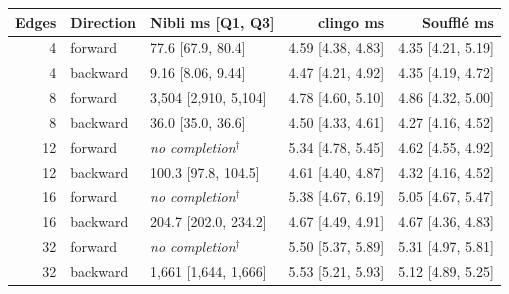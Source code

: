\begin{tabular}{rllrr}
\toprule
Edges & Direction & Nibli ms [Q1, Q3] & clingo ms & Souffl\'e ms \\
\midrule
4 & forward & 77.6 [67.9, 80.4] & 4.59 [4.38, 4.83] & 4.35 [4.21, 5.19] \\
4 & backward & 9.16 [8.06, 9.44] & 4.47 [4.21, 4.92] & 4.35 [4.19, 4.72] \\
8 & forward & 3,504 [2,910, 5,104] & 4.78 [4.60, 5.10] & 4.86 [4.32, 5.00] \\
8 & backward & 36.0 [35.0, 36.6] & 4.50 [4.33, 4.61] & 4.27 [4.16, 4.52] \\
12 & forward & \textit{no completion}$^{\dagger}$ & 5.34 [4.78, 5.45] & 4.62 [4.55, 4.92] \\
12 & backward & 100.3 [97.8, 104.5] & 4.61 [4.40, 4.87] & 4.32 [4.16, 4.52] \\
16 & forward & \textit{no completion}$^{\dagger}$ & 5.38 [4.67, 6.19] & 5.05 [4.67, 5.47] \\
16 & backward & 204.7 [202.0, 234.2] & 4.67 [4.49, 4.91] & 4.67 [4.36, 4.83] \\
32 & forward & \textit{no completion}$^{\dagger}$ & 5.50 [5.37, 5.89] & 5.31 [4.97, 5.81] \\
32 & backward & 1,661 [1,644, 1,666] & 5.53 [5.21, 5.93] & 5.12 [4.89, 5.25] \\
\bottomrule
\end{tabular}
